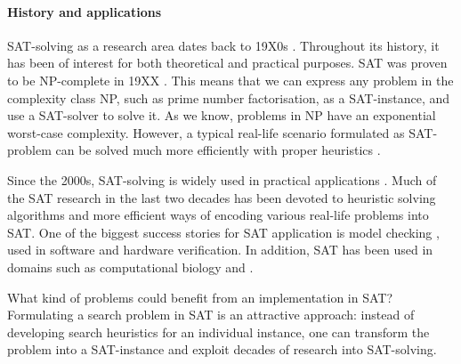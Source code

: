 \paragraph{History and applications}

SAT-solving as a research area dates back to 19X0s . Throughout its history, it has been of interest for both theoretical and practical purposes. 
SAT was proven to be NP-complete in 19XX . This means that we can express any problem in the complexity class NP, such as prime number factorisation, as a SAT-instance, and use a SAT-solver to solve it.
As we know, problems in NP have an exponential worst-case complexity. However, a typical real-life scenario formulated as SAT-problem can be solved much more efficiently with proper heuristics \cite{claessen2009satpractice}.


Since the 2000s, SAT-solving is widely used in practical applications \cite{marques_silva2010}. Much of the SAT research in the last two decades has been devoted to heuristic solving algorithms and more efficient ways of encoding various real-life problems into SAT.
One of the biggest success stories for SAT application is model checking , used in software and hardware verification. In addition, SAT has been used in domains such as computational biology  and .

What kind of problems could benefit from an implementation in SAT?
Formulating a search problem in SAT is an attractive approach: instead of developing search heuristics for an individual instance, one can transform the problem into a SAT-instance and exploit decades of research into SAT-solving. 

